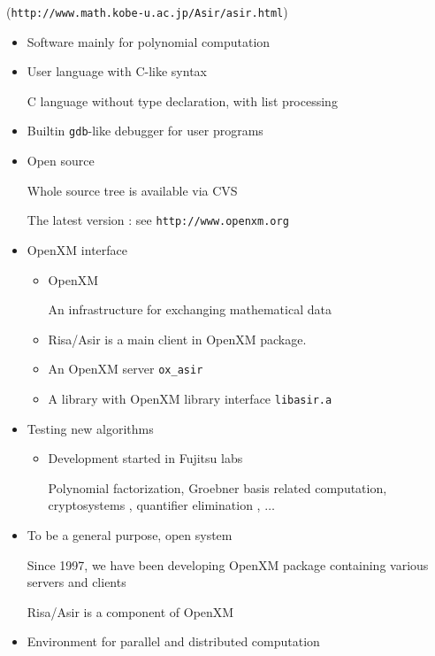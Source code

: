\documentclass{slides}
\begin{document}
\begin{slide}{}

({\tt http://www.math.kobe-u.ac.jp/Asir/asir.html})

\begin{itemize}
\item Software mainly for polynomial computation

\item User language with C-like syntax

C language without type declaration, with list processing

\item Builtin {\tt gdb}-like debugger for user programs

\item Open source

Whole source tree is available via CVS

The latest version : see {\tt http://www.openxm.org}

\item OpenXM interface

\begin{itemize}
\item OpenXM 

An infrastructure for exchanging mathematical data
\item Risa/Asir is a main client in OpenXM package.
\item An OpenXM server {\tt ox\_asir}
\item A library with OpenXM library interface {\tt libasir.a}
\end{itemize}
\end{itemize}
\end{slide}

\begin{slide}{}

\begin{itemize}
\item Testing new algorithms

\begin{itemize}
\item Development started in Fujitsu labs

Polynomial factorization, Groebner basis related computation,
cryptosystems , quantifier elimination , $\ldots$
\end{itemize}

\item To be a general purpose, open system

Since 1997, we have been developing OpenXM package
containing various servers and clients

Risa/Asir is a component of OpenXM

\item Environment for parallel and distributed computation

\end{itemize}
\end{slide}
\end{document}
